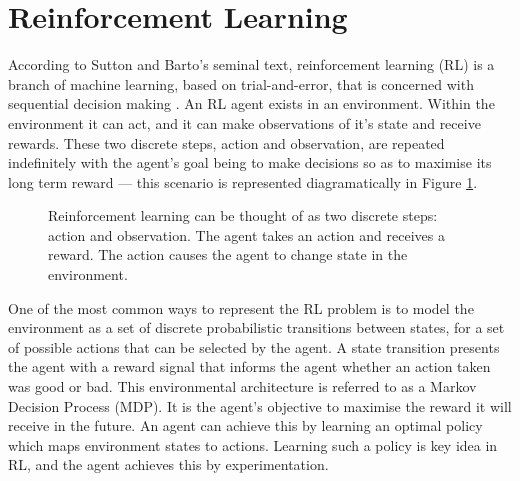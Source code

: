 \section{Reinforcement Learning}\label{rl}
According to Sutton and Barto's seminal text, reinforcement learning (RL) is a branch of machine learning, based on trial-and-error, that is concerned with sequential decision making \cite{Sutton2018}. An RL agent exists in an environment. Within the environment it can act, and it can make observations of it's state and receive rewards. These two discrete steps, action and observation, are repeated indefinitely with the agent's goal being to make decisions so as to maximise its long term reward --- this scenario is represented diagramatically in Figure \ref{fig:209_reinforcement_learning_problem}.

\begin{figure}[h]
	\centering
	
	\caption[Reinforcement learning model overview]{Reinforcement learning can be thought of as two discrete steps: action and observation. The agent takes an action and receives a reward. The action causes the agent to change state in the environment.}
	\label{fig:209_reinforcement_learning_problem}
\end{figure}

One of the most common ways to represent the RL problem is to model the environment as a set of discrete probabilistic transitions between states, for a set of possible actions that can be selected by the agent. A state transition presents the agent with a reward signal that informs the agent whether an action taken was good or bad. This environmental architecture is referred to as a Markov Decision Process (MDP). It is the agent's objective to maximise the reward it will receive in the future. An agent can achieve this by learning an optimal policy which maps environment states to actions. Learning such a policy is key idea in RL, and the agent achieves this by experimentation.


